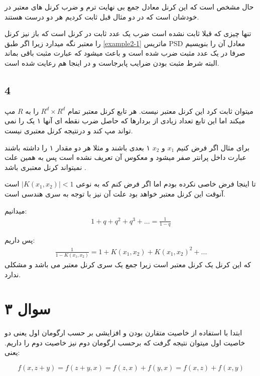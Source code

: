 \documentclass{article}[12pt]
\begin{document}
حال مشخص است که این کرنل معادل جمع بی نهایت ترم و ضرب کرنل های معتبر در خودشان است که در دو مثال قبل ثابت کردیم هر دو درست هستند. 

تنها چیزی که قبلا ثابت نشده است ضرب یک عدد ثابت در کرنل است که باز نیز کرنل را معتبر نگه میدارد زیرا اگر طبق 
\ref{example2-1}
 ماتریس 
PSD
معادل آن را بنویسیم صرفا در یک عدد مثبت ضرب شده است و باعث میشود که عبارت مثبت باقی بماند البته شرط مثبت بودن ضرایب پابرجاست و در اینجا هم رعایت شده است. 
\clearpage
\subsection{4}

میتوان ثابت کرد این کرنل معتبر نیست. هر تابع کرنل معتبر تمام  
$R^d\times R^d$ 
را به 
$R$
مپ میکند
اما این تابع تعداد زیادی از بردارها که حاصل ضرب نقطه ای آنها ۱ یک را نمی تواند مپ کند و درنتیجه کرنل معتبری نیست. 

برای مثال اگر فرض کنیم 
$x_1$
و 
$x_2$
۱ بعدی باشند
و مثلا هر دو مقدار ۱ را داشته باشند عبارت داخل پرانتر صفر میشود و معکوس آن تعریف نشده است پس به همین علت نمیتواند کرنل معتبری باشد .


تا اینجا فرض خاصی نکرده بودم اما اگر فرض کنم که
به نوعی 
$|K(x_1,x_2)|<1$
است آنوقت این کرنل معتبر خواهد بود علت آن نیز با توجه به سری هندسی است. 

میدانیم:
\begin{equation*}
\begin{split}
1+q+q^2+q^3 + ... = \frac{1}{1-q}
\end{split}
\end{equation*}

پس داریم:
\begin{equation*}
\begin{split}
\frac{1}{1-K(x_1,x_2)} = 1+ K(x_1,x_2) + 
K(x_1,x_2)^2 + ... 
\end{split}
\end{equation*}
که این کرنل یک کرنل معتبر است زیرا جمع یک سری کرنل معتبر می باشد و مشکلی ندارد. 
\clearpage
\section{سوال ۳}
ابتدا با استفاده از خاصیت متقارن بودن و افزایشی بر حسب ارگومان اول یعنی دو خاصیت اول میتوان نتیجه گرفت که برحسب ارگومان دوم نیز خاصیت دوم را داریم.
یعنی:

\begin{equation}
f(x,z+y) = f(z+y,x) = f(z,x) + f(y,x) =f(x,z) + f(x,y)
\end{equation}
\end{document}
